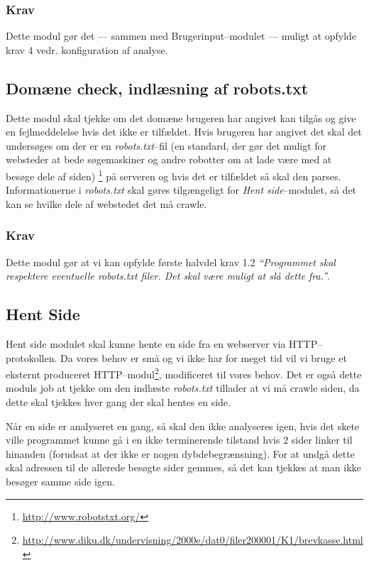 \documentclass[a4paper,oneside]{memoir}
\begin{document}
\subsubsection{Krav}
Dette modul gør det --- sammen med Brugerinput--modulet --- muligt at
opfylde krav 4 vedr. konfiguration af analyse.

\subsection{Domæne check, indlæsning af robots.txt}
Dette modul skal tjekke om det domæne brugeren har angivet kan tilgås
og give en fejlmeddelelse hvis det ikke er tilfældet. Hvis brugeren
har angivet det skal det undersøges om der er en
\textit{robots.txt}--fil (en standard, der gør det muligt for websteder
at bede søgemaskiner og andre robotter om at lade være med at besøge
dele af siden) \footnote{\url{http://www.robotstxt.org/}} på serveren
og hvis det er tilfældet så skal den parses. Informationerne i
\textit{robots.txt} skal gøres tilgængeligt for \textit{Hent
  side}--modulet, så det kan se hvilke dele af webstedet det må crawle.

\subsubsection{Krav}
Dette modul gør at vi kan opfylde første halvdel krav 1.2
\textit{``Programmet skal respektere eventuelle robots.txt filer. Det
  skal være muligt at slå dette fra.''}.

\subsection{Hent Side}
\label{hentside}
Hent side modulet skal kunne hente en side fra en webserver via
HTTP--protokollen. Da vores behov er små og vi ikke har for meget tid
vil vi bruge et eksternt produceret
HTTP--modul\footnote{\url{http://www.diku.dk/undervisning/2000e/dat0/filer200001/K1/brevkasse.html}},
modificeret til vores behov. Det er også dette moduls job at tjekke om
den indlæste \textit{robots.txt} tillader at vi må crawle siden, da dette skal
tjekkes hver gang der skal hentes en side.

Når en side er analyseret en gang, så skal den ikke analyseres igen,
hvis det skete ville programmet kunne gå i en ikke terminerende
tilstand hvis 2 sider linker til hinanden (forudsat at der ikke er
nogen dybdebegrænsning). For at undgå dette skal adressen til de
allerede besøgte sider gemmes, så det kan tjekkes at man ikke besøger
samme side igen.
\end{document}
